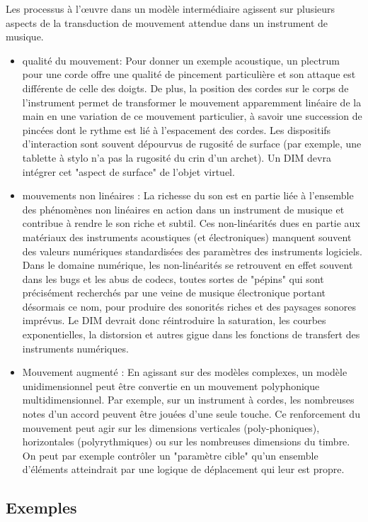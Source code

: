 Les processus à l'œuvre dans un modèle intermédiaire agissent sur plusieurs aspects de la transduction de mouvement attendue dans un instrument de musique.
\vspace{-1em}
\begin{itemize}[noitemsep]
	\item qualité du mouvement: Pour donner un exemple acoustique, un plectrum pour une corde
offre une qualité de pincement particulière et son attaque est différente de celle des doigts. De plus, la position des cordes sur le corps de l'instrument permet de transformer le mouvement apparemment linéaire de la main en une variation de ce mouvement particulier, à savoir une succession de pincées dont le rythme est lié à l'espacement des cordes. Les dispositifs d'interaction sont souvent dépourvus de rugosité de surface (par exemple, une tablette à stylo n'a pas la rugosité du crin d'un archet). Un DIM devra intégrer cet "aspect de surface" de l'objet virtuel.
	\item mouvements non linéaires : La richesse du son est en partie liée à l'ensemble des phénomènes non linéaires en action dans un instrument de musique et contribue à rendre le son riche et subtil. Ces non-linéarités dues en partie aux matériaux des instruments acoustiques (et électroniques) manquent souvent des valeurs numériques standardisées des paramètres des instruments logiciels. Dans le domaine numérique, les non-linéarités se retrouvent en effet souvent dans les bugs et les abus de codecs, toutes sortes de "pépins" qui sont précisément recherchés par une veine de musique électronique portant désormais ce nom, pour produire des sonorités riches et des paysages sonores imprévus. Le DIM devrait donc réintroduire la saturation, les courbes exponentielles, la distorsion et autres gigue dans les fonctions de transfert des instruments numériques. 
	\item Mouvement augmenté : En agissant sur des modèles complexes, un modèle unidimensionnel
peut être convertie en un mouvement polyphonique multidimensionnel. Par exemple, sur un instrument à cordes, les nombreuses notes d'un accord peuvent être jouées d'une seule touche. Ce renforcement du mouvement peut agir sur les dimensions verticales (poly-phoniques), horizontales (polyrythmiques) ou sur les nombreuses dimensions du timbre. On peut par exemple contrôler un "paramètre cible" qu'un ensemble d'éléments atteindrait par une logique de déplacement qui leur est propre.
\end{itemize}

\subsection{Exemples}

